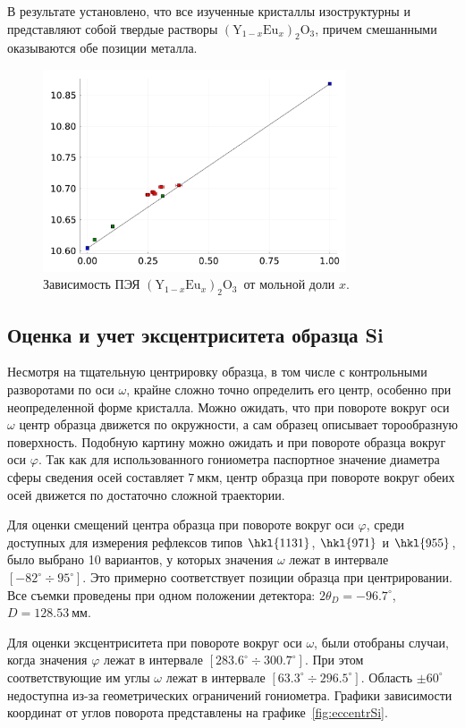 \documentclass[a4paper,14pt]{extarticle}
\newcommand{\unit}[1]{ \ \text{#1}}
\newcommand{\degree}{^\circ}
\newcommand{\YEu}{${(\text{Y}_{1-x}\text{Eu}_x)}_2\text{O}_3$}
\newcommand{\range}[2]{[#1\div#2]}
\newcounter{x}
\begin{document}
В результате установлено, что все изученные кристаллы изоструктурны и представляют собой твердые растворы \YEu, причем смешанными оказываются обе позиции металла.
\begin{figure}[ht!]
    \centering
    \includegraphics[width=0.8\textwidth]{YEu.pdf}
    \caption{Зависимость ПЭЯ \YEu~от мольной доли $x$.}
    \label{fig:YEu}
\end{figure}

\subsection{Оценка и учет эксцентриситета образца Si}
Несмотря на тщательную центрировку образца, в том числе с контрольными разворотами по оси $\omega$, крайне сложно точно определить его центр, особенно при неопределенной форме кристалла.
Можно ожидать, что при повороте вокруг оси $\omega$ центр образца движется по окружности, а сам образец описывает торообразную поверхность.
Подобную картину можно ожидать и при повороте образца вокруг оси $\varphi$.
Так как для использованного гониометра паспортное значение диаметра сферы сведения осей составляет $7\unit{мкм}$, центр образца при повороте вокруг обеих осей движется по достаточно сложной траектории.

Для оценки смещений центра образца при повороте вокруг оси $\varphi$, среди доступных для измерения рефлексов типов $\hkl{11 3 1}$, $\hkl{9 7 1}$ и $\hkl{9 5 5}$, было выбрано 10 вариантов, у которых значения $\omega$ лежат в интервале $\range{-82\degree}{95\degree}$.
Это примерно соответствует позиции образца при центрировании.
Все съемки проведены при одном положении детектора: $2\theta_D = -96.7\degree$, $D = 128.53\unit{мм}$.

Для оценки эксцентриситета при повороте вокруг оси $\omega$, были отобраны случаи, когда значения $\varphi$ лежат в интервале $\range{283.6\degree}{300.7\degree}$.
При этом соответствующие им углы $\omega$ лежат в интервале $\range{63.3\degree}{296.5\degree}$.
Область $\pm 60\degree$ недоступна из-за геометрических ограничений гониометра.
Графики зависимости координат от углов поворота представлены на графике~\ref{fig:eccentrSi}.
\end{document}

